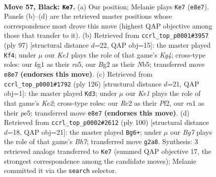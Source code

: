 \documentclass[11pt]{article}
\begin{document}
\clearpage

\begin{figure}[p]\centering
\begin{subfigure}{0.46\textwidth}\centering
\resizebox{\linewidth}{!}{%
\newchessgame
\chessboard[
  setfen={4k3/5p2/6p1/1R6/1P5P/8/2r3b1/R5K1 b - - 0 57},
  showmover=false,
  pgfstyle=straightmove, color=movearrow, markmove={e8-e7}
]}
\caption{}
\end{subfigure}\hfill
\begin{subfigure}{0.46\textwidth}\centering
\resizebox{\linewidth}{!}{%
\newchessgame
\chessboard[
  setfen={8/8/1r6/Rn3pk1/1P2p3/8/1RK2P2/8 b - - 1 49},
  showmover=false,
  pgfstyle=straightmove, color=movearrow, markmove={g5-f4}
]}
\caption{}
\end{subfigure}
\\[4pt]
\begin{subfigure}{0.46\textwidth}\centering
\resizebox{\linewidth}{!}{%
\newchessgame
\chessboard[
  setfen={6R1/3k4/8/p3p3/r5p1/6P1/2P1KP2/8 w - - 10 64},
  showmover=false,
  pgfstyle=straightmove, color=movearrow, markmove={e2-d3}
]}
\caption{}
\end{subfigure}\hfill
\begin{subfigure}{0.46\textwidth}\centering
\resizebox{\linewidth}{!}{%
\newchessgame
\chessboard[
  setfen={4r2k/5p1B/3p1P2/p7/1r6/6K1/P4P2/7R w - - 7 51},
  showmover=false,
  pgfstyle=straightmove, color=movearrow, markmove={h7-g6}
]}
\caption{}
\end{subfigure}
\caption{\textbf{Move 57, Black: \texttt{Ke7}.} (a) Our position; Melanie plays \texttt{Ke7} (\texttt{e8e7}). Panels (b)--(d) are the retrieved master positions whose correspondence most drove this move (highest QAP objective among those that transfer to it). (b) Retrieved from \texttt{ccrl\_top\_p0001\#3957} (ply 97) [structural distance $d$=22, QAP obj=15]: the master played \texttt{Kf4}; under $\mu$ our \emph{Ke1} plays the role of that game's \emph{Kg4}; cross-type roles: our \emph{k}g1 as their \emph{r}a5, our \emph{B}g2 as their \emph{N}b5; transferred move \texttt{e8e7} \textbf{(endorses this move)}. (c) Retrieved from \texttt{ccrl\_top\_p0001\#1792} (ply 126) [structural distance $d$=21, QAP obj=1]: the master played \texttt{Kd3}; under $\mu$ our \emph{Ke1} plays the role of that game's \emph{Ke2}; cross-type roles: our \emph{R}c2 as their \emph{P}f2, our \emph{r}a1 as their \emph{p}e5; transferred move \texttt{e8e7} \textbf{(endorses this move)}. (d) Retrieved from \texttt{ccrl\_top\_p0002\#2612} (ply 100) [structural distance $d$=18, QAP obj=21]: the master played \texttt{Bg6+}; under $\mu$ our \emph{Bg7} plays the role of that game's \emph{Bh7}; transferred move \texttt{g2a8}. Synthesis: 3 retrieved analogs transferred to \texttt{Ke7} (summed QAP objective 17, the strongest correspondence among the candidate moves); Melanie committed it via the \texttt{search} selector.}
\label{fig:thought-m113}
\end{figure}
\end{document}

